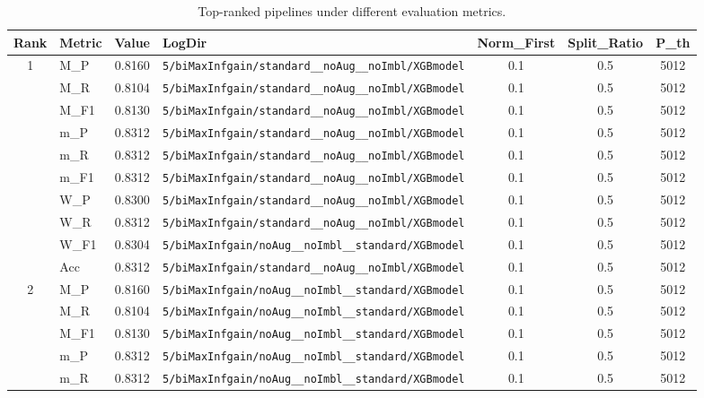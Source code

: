 \begin{table}[htbp]
\caption{Top-ranked pipelines under different evaluation metrics.}
\label{tab:rank_metric_vertical}
\centering
\small
\setlength{\tabcolsep}{4pt}
\begin{tabular}{|c|l|c|>{\ttfamily\footnotesize}p{7.2cm}|c|c|c|}
\hline
Rank & Metric & Value & LogDir & Norm\_First & Split\_Ratio & P\_th \\
\hline
\multirow{10}{*}{1} & M\_P & 0.8160 & \texttt{5/biMaxInfgain/standard\_\_noAug\_\_noImbl/XGBmodel} & 0.1 & 0.5  & 5012 \\ 
 & M\_R & 0.8104 & \texttt{5/biMaxInfgain/standard\_\_noAug\_\_noImbl/XGBmodel} & 0.1 & 0.5  & 5012 \\ 
 & M\_F1 & 0.8130 & \texttt{5/biMaxInfgain/standard\_\_noAug\_\_noImbl/XGBmodel} & 0.1 & 0.5  & 5012 \\ 
 & m\_P & 0.8312 & \texttt{5/biMaxInfgain/standard\_\_noAug\_\_noImbl/XGBmodel} & 0.1 & 0.5  & 5012 \\ 
 & m\_R & 0.8312 & \texttt{5/biMaxInfgain/standard\_\_noAug\_\_noImbl/XGBmodel} & 0.1 & 0.5  & 5012 \\ 
 & m\_F1 & 0.8312 & \texttt{5/biMaxInfgain/standard\_\_noAug\_\_noImbl/XGBmodel} & 0.1 & 0.5  & 5012 \\ 
 & W\_P & 0.8300 & \texttt{5/biMaxInfgain/standard\_\_noAug\_\_noImbl/XGBmodel} & 0.1 & 0.5  & 5012 \\ 
 & W\_R & 0.8312 & \texttt{5/biMaxInfgain/standard\_\_noAug\_\_noImbl/XGBmodel} & 0.1 & 0.5  & 5012 \\ 
 & W\_F1 & 0.8304 & \texttt{5/biMaxInfgain/noAug\_\_noImbl\_\_standard/XGBmodel} & 0.1 & 0.5  & 5012 \\ 
 & Acc & 0.8312 & \texttt{5/biMaxInfgain/standard\_\_noAug\_\_noImbl/XGBmodel} & 0.1 & 0.5  & 5012 \\ 
\hline
\multirow{10}{*}{2} & M\_P & 0.8160 & \texttt{5/biMaxInfgain/noAug\_\_noImbl\_\_standard/XGBmodel} & 0.1 & 0.5  & 5012 \\ 
 & M\_R & 0.8104 & \texttt{5/biMaxInfgain/noAug\_\_noImbl\_\_standard/XGBmodel} & 0.1 & 0.5  & 5012 \\ 
 & M\_F1 & 0.8130 & \texttt{5/biMaxInfgain/noAug\_\_noImbl\_\_standard/XGBmodel} & 0.1 & 0.5  & 5012 \\ 
 & m\_P & 0.8312 & \texttt{5/biMaxInfgain/noAug\_\_noImbl\_\_standard/XGBmodel} & 0.1 & 0.5  & 5012 \\ 
 & m\_R & 0.8312 & \texttt{5/biMaxInfgain/noAug\_\_noImbl\_\_standard/XGBmodel} & 0.1 & 0.5  & 5012 \\ 

\end{tabular}
\end{table}
